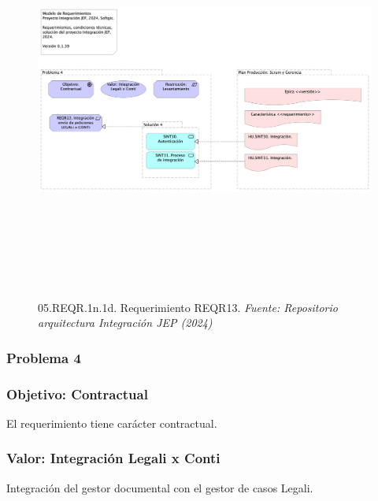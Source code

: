 \documentclass[
  paper=a4,
  ,captions=tableheading
]{scrartcl}
\begin{document}
\begin{figure}
\centering
\includegraphics[width=\textwidth,height=5.20833in]{images/05.REQR.1n.1d.RequerimientoREQR13.png}
\caption{05.REQR.1n.1d. Requerimiento REQR13. \emph{Fuente: Repositorio
arquitectura Integración JEP
(2024)}}\label{fig:id-c16e7b2e768c4de7ab50fb13972e5c08}
\end{figure}

\subsubsection{Problema 4}\label{sec:problema-4}

\subsubsection{Objetivo: Contractual}\label{sec:objetivo-contractual}

El requerimiento tiene carácter contractual.

\subsubsection{Valor: Integración Legali x
Conti}\label{sec:valor-integraciuxf3n-legali-x-conti}

Integración del gestor documental con el gestor de casos Legali.
\end{document}
